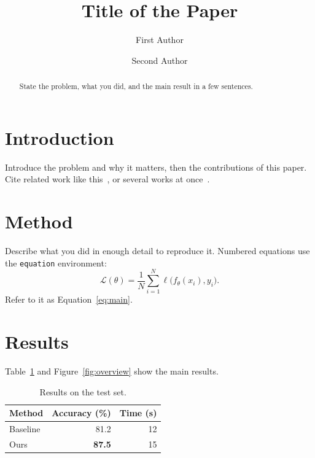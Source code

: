 \documentclass[manuscript,review,anonymous]{acmart}
\begin{document}
\title{Title of the Paper}

\author{First Author}

\author{Second Author}

\begin{abstract}
State the problem, what you did, and the main result in a few sentences.
\end{abstract}


\maketitle

\section{Introduction}
\label{sec:intro}
Introduce the problem and why it matters, then the contributions of this
paper. Cite related work like this~\cite{vaswani2017attention}, or several works at
once~\cite{vaswani2017attention,lecun2015deep}.

\section{Method}
\label{sec:method}
Describe what you did in enough detail to reproduce it. Numbered equations use
the \texttt{equation} environment:
\begin{equation}
  \label{eq:main}
  \mathcal{L}(\theta) = \frac{1}{N} \sum_{i=1}^{N} \ell\bigl(f_\theta(x_i), y_i\bigr).
\end{equation}
Refer to it as Equation~\eqref{eq:main}.

\section{Results}
\label{sec:results}
Table~\ref{tab:results} and Figure~\ref{fig:overview} show the main results.

\begin{table}[htbp]
  \centering
  \caption{Results on the test set.}
  \label{tab:results}
  \begin{tabular}{lrr}
    \toprule
    Method & Accuracy (\%) & Time (s) \\
    \midrule
    Baseline & 81.2 & 12 \\
    Ours & \textbf{87.5} & 15 \\
    \bottomrule
  \end{tabular}
\end{table}
\end{document}
